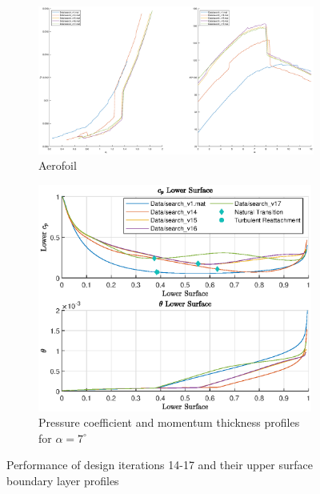 \documentclass{article}
\begin{document}
\begin{figure}[H]
    \centering
    \begin{subfigure}{0.45\textwidth}
        \centering
        \includegraphics[width=1.2\textwidth, center]{figures/hiRe_lod_17.eps}
        \caption{Aerofoil}
        \label{fig:v17_lod}
    \end{subfigure}
    \begin{subfigure}{0.54\textwidth}
        \centering
        \includegraphics[width=0.99\textwidth]{figures/hiRe_lowerprofile_17_a7.eps}
        \caption{Pressure coefficient and momentum thickness profiles for $\alpha = 7^\circ$}
        \label{fig:v17_lprofile}
    \end{subfigure}
    \caption{Performance of design iterations 14-17 and their upper surface boundary layer profiles}
\end{figure}
\end{document}

